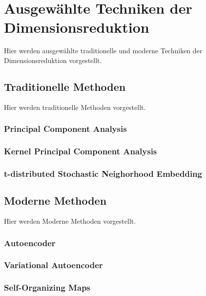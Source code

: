 \chapter{Ausgewählte Techniken der Dimensionsreduktion}
\label{ch:TechnikenDerDimRed}


Hier werden ausgewählte traditionelle und moderne Techniken der Dimensionsreduktion vorgestellt. 

\section{Traditionelle Methoden}
\label{ch:TechnikenDerDimRed:sec:TraditionelleMethoden}

Hier werden traditionelle Methoden vorgestellt.

\subsection{Principal Component Analysis}
\label{ch:TechnikenDerDimRed:sec:TradtionelleMethoden:subsec:PCA}


\subsection{Kernel Principal Component Analysis}
\label{ch:TechnikenDerDimRed:sec:TradtionelleMethoden:subsec:kPCA}

\subsection{t-distributed Stochastic Neighorhood Embedding}
\label{ch:TechnikenDerDimRed:sec:TradtionelleMethoden:subsec:t-SNE}

\newpage


\section{Moderne Methoden}
\label{ch:TechnikenDerDimRed:sec:ModerneMethoden}

Hier werden Moderne Methoden vorgestellt.

\subsection{Autoencoder}
\label{ch:TechnikenDerDimRed:sec:ModerneMethoden:subsec:AE}

\subsection{Variational Autoencoder}
\label{ch:TechnikenDerDimRed:sec:ModerneMethoden:subsec:VAE}

\subsection{Self-Organizing Maps}
\label{ch:TechnikenDerDimRed:sec:ModerneMethoden:subsec:SOM}

